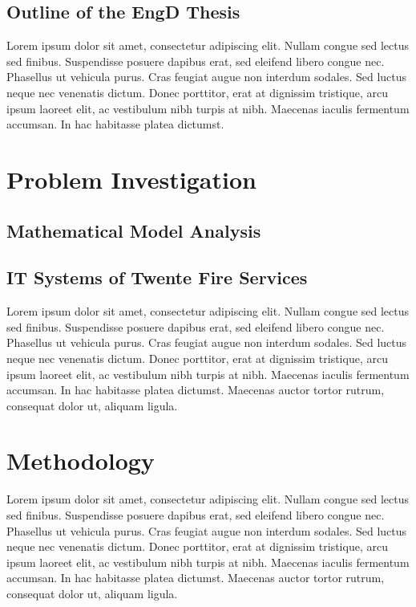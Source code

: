 \documentclass{utitcphd_overleaf}
\begin{document}
\section{Outline of the EngD Thesis}

Lorem ipsum dolor sit amet, consectetur adipiscing elit. Nullam congue sed lectus sed finibus. Suspendisse posuere dapibus erat, sed eleifend libero congue nec. Phasellus ut vehicula purus. Cras feugiat augue non interdum sodales. Sed luctus neque nec venenatis dictum. Donec porttitor, erat at dignissim tristique, arcu ipsum laoreet elit, ac vestibulum nibh turpis at nibh. Maecenas iaculis fermentum accumsan. In hac habitasse platea dictumst.

\chapter{Problem Investigation}
\label{chap:problem}

\section{Mathematical Model Analysis}
\section{IT Systems of Twente Fire Services}

Lorem ipsum dolor sit amet, consectetur adipiscing elit. Nullam congue sed lectus sed finibus. Suspendisse posuere dapibus erat, sed eleifend libero congue nec. Phasellus ut vehicula purus. Cras feugiat augue non interdum sodales. Sed luctus neque nec venenatis dictum. Donec porttitor, erat at dignissim tristique, arcu ipsum laoreet elit, ac vestibulum nibh turpis at nibh. Maecenas iaculis fermentum accumsan. In hac habitasse platea dictumst. Maecenas auctor tortor rutrum, consequat dolor ut, aliquam ligula.

\chapter{Methodology}
\label{chap:management}

Lorem ipsum dolor sit amet, consectetur adipiscing elit. Nullam congue sed lectus sed finibus. Suspendisse posuere dapibus erat, sed eleifend libero congue nec. Phasellus ut vehicula purus. Cras feugiat augue non interdum sodales. Sed luctus neque nec venenatis dictum. Donec porttitor, erat at dignissim tristique, arcu ipsum laoreet elit, ac vestibulum nibh turpis at nibh. Maecenas iaculis fermentum accumsan. In hac habitasse platea dictumst. Maecenas auctor tortor rutrum, consequat dolor ut, aliquam ligula.
\end{document}
